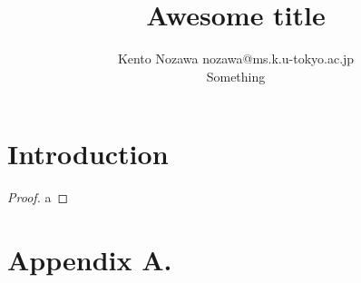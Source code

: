 \documentclass[twoside,11pt]{article}
\begin{document}
\title{Awesome title}

\author{\name Kento Nozawa \email nozawa@ms.k.u-tokyo.ac.jp \\
      \addr Something
}


\maketitle

\begin{abstract} %

\end{abstract}

\begin{keywords}

\end{keywords}

\section{Introduction}
\begin{proof}
  a
\end{proof}

\acks{}

\newpage

\appendix
\section*{Appendix A.}
\label{app:theorem}

\vskip 0.2in

\end{document}
